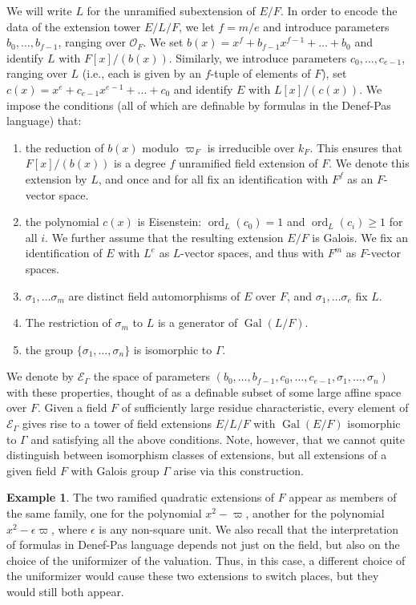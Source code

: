 \documentclass{amsart}
\newcommand{\ri}{\mathcal{O}}
\newcommand{\gal}{\operatorname{Gal}}
\newcommand\cE{{\mathcal E}}
\DeclareMathOperator{\ord}{ord}
\theoremstyle{plain}
\theoremstyle{definition}
\newtheorem{example}[thm]{Example}
\begin{document}
We will write $L$ for the unramified subextension of $E/F$.  In order to encode the data of the extension tower $E/L/F$, we let $f=m/e$ and introduce parameters $b_0,\dots, b_{f-1}$, ranging over $\ri_F$.
We set $b(x)=x^f+b_{f-1}x^{f-1}+ \dots + b_0$ and identify $L$ with $F[x]/(b(x))$. 
Similarly, we introduce parameters $c_0, \dots, c_{e-1}$, ranging over $L$
(i.e., each is given by an $f$-tuple of elements of $F$), set $c(x) = x^e + c_{e-1}x^{e-1} + \dots + c_0$ and identify $E$ with $L[x]/(c(x))$. 
We impose the conditions (all of which are definable by formulas in the Denef-Pas language) that: 
\begin{enumerate}
\item the reduction of $b(x)$ modulo $\varpi_F$ is irreducible over $k_F$. 
This ensures that $F[x]/(b(x))$ is a degree $f$ unramified field extension of $F$. 
We denote this extension by $L$, and once and for all fix an identification with $F^f$ as 
an $F$-vector space. 
\item the polynomial $c(x)$ is Eisenstein: $\ord_L(c_0) = 1$ and $\ord_L(c_i) \ge 1$ for all $i$.
We further assume that the resulting extension $E/F$ is Galois.
We fix an identification of $E$ with $L^e$ as $L$-vector spaces, and thus with $F^m$ as $F$-vector spaces. 
\item $\sigma_1, \dots \sigma_m$ are distinct field automorphisms of $E$ over $F$, and 
 $\sigma_1, \dots \sigma_e$ fix $L$.
\item The restriction of $\sigma_m$ to $L$ is a generator of $\gal(L/F)$. 
\item the group $\{\sigma_1, \dots, \sigma_n\}$ is isomorphic to $\Gamma$.
\end{enumerate}
We denote by $\cE_\Gamma$ the space of parameters $(b_0, \dots, b_{f-1}, c_0, \dots, c_{e-1}, \sigma_1, \dots, \sigma_n)$ with these properties, thought of as a definable subset of some large affine space over $F$. 
Given a field $F$ of sufficiently large residue characteristic, every element of $\cE_\Gamma$ gives rise to a tower of field extensions $E/L/F$ with $\gal(E/F)$ isomorphic to $\Gamma$ and satisfying all the above conditions. Note, however, that we cannot quite distinguish between 
isomorphism classes of extensions, but all extensions of a given field $F$ with Galois group 
$\Gamma$ arise via this construction.   
\begin{example}
The two ramified quadratic extensions of $F$ appear as members of the same family, one for the 
polynomial $x^2-\varpi$, another for the polynomial $x^2-\epsilon\varpi$, where $\epsilon$  is any non-square unit. We also recall that the interpretation of formulas in Denef-Pas language depends not just on the field, but also on the choice of the uniformizer of the valuation. Thus, in this case, a different choice of the uniformizer would cause these two extensions to switch places, but they would still both appear. 
\end{example}
\end{document}
